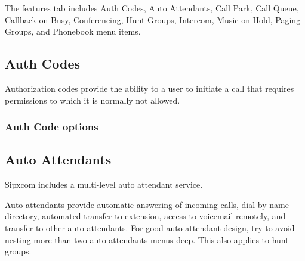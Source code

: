 \documentclass[letterpaper,10pt,english]{sphinxmanual}
\begin{document}
The features tab includes Auth Codes, Auto Attendants, Call Park, Call Queue, Callback on Busy, Conferencing, Hunt Groups, Intercom, Music on Hold, Paging Groups, and Phonebook menu items.


\subsection{Auth Codes}
\label{\detokenize{webui:auth-codes}}\label{\detokenize{webui:id7}}
Authorization codes provide the ability to a user to initiate a call that requires permissions to which it is normally not allowed.
\begin{quote}

\end{quote}


\subsubsection{Auth Code options}
\label{\detokenize{webui:auth-code-options}}\begin{quote}

\end{quote}


\subsection{Auto Attendants}
\label{\detokenize{webui:auto-attendants}}\label{\detokenize{webui:id8}}
Sipxcom includes a multi-level auto attendant service.
\begin{quote}

\end{quote}

Auto attendants provide automatic answering of incoming calls, dial-by-name directory, automated transfer to extension, access to voicemail remotely, and transfer to other auto attendants.
For good auto attendant design, try to avoid nesting more than two auto attendants menus deep. This also applies to hunt groups.
\end{document}
